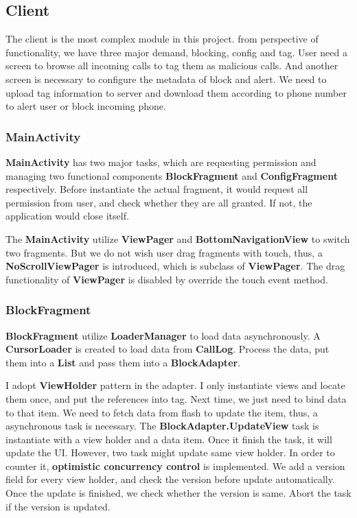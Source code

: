 \documentclass{article}
\begin{document}
    \subsection{Client}
    The client is the most complex module in this project.
    from perspective of functionality, we have three major demand, blocking, config and tag.
    User need a screen to browse all incoming calls to tag them as malicious calls.
    And another screen is necessary to configure the metadata of block and alert.
    We need to upload tag information to server and download them according to phone number to alert user or block incoming phone.

    \subsubsection{MainActivity}
    \textbf{MainActivity} has two major tasks, which are requesting permission and managing two functional components \textbf{BlockFragment} and \textbf{ConfigFragment} respectively.
    Before instantiate the actual fragment, it would request all permission from user, and check whether they are all granted.
    If not, the application would close itself.

    The \textbf{MainActivity} utilize \textbf{ViewPager} and \textbf{BottomNavigationView} to switch two fragments.
    But we do not wish user drag fragments with touch, thus, a \textbf{NoScrollViewPager} is introduced, which is subclass of \textbf{ViewPager}.
    The drag functionality of \textbf{ViewPager} is disabled by override the touch event method.

    \subsubsection{BlockFragment}
    \textbf{BlockFragment} utilize \textbf{LoaderManager} to load data asynchronously.
    A \textbf{CursorLoader} is created to load data from \textbf{CallLog}.
    Process the data, put them into a \textbf{List} and pass them into a \textbf{BlockAdapter}.

    I adopt \textbf{ViewHolder} pattern in the adapter.
    I only instantiate views and locate them once, and put the references into tag.
    Next time, we just need to bind data to that item.
    We need to fetch data from flash to update the item, thus, a asynchronous task is necessary.
    The \textbf{BlockAdapter.UpdateView} task is instantiate with a view holder and a data item.
    Once it finish the task, it will update the UI. However, two task might update same view holder.
    In order to counter it, \textbf{optimistic concurrency control} is implemented.
    We add a version field for every view holder, and check the version before update automatically.
    Once the update is finished, we check whether the version is same.
    Abort the task if the version is updated.
\end{document}
